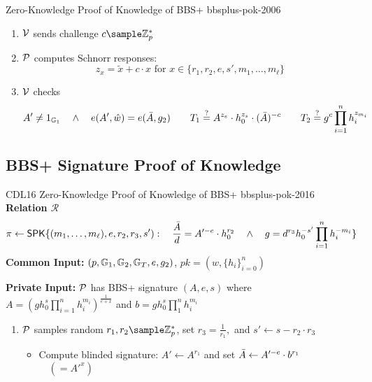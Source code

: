 {\begin{protocol}{\cite{hutchison_constant-size_2006} Zero-Knowledge Proof of Knowledge of BBS+ }{bbsplus-pok-2006}
\begin{enumerate}
\begin{itemize}
        \end{itemize}

    \item $\mathcal{V}$ sends challenge $c \sample \Z_p^*$\

    \item $\mathcal{P}$ computes Schnorr responses:
         \[
         z_x = \tilde{x} + c \cdot x \text{ for } x \in \{r_1, r_2, e, s', m_1, \ldots, m_{\ell}\}
         \]
 
    \item $\mathcal{V}$ checks
        \[
            A' \neq 1_{\mathbb{G}_1} \quad \wedge \quad e(A',\hat{w}) = e(\Bar{A},g_2) \qquad T_1 \stackrel{?}{=} A^{z_e} \cdot h_0^{z_s} \cdot (\Bar{A})^{-c} \qquad T_2 \stackrel{?}{=} g^c\prod_{i=1}^n h_i^{z_{m_i}}
        \]
    \end{enumerate}
\end{protocol}







% 
% 



\newpage
\subsection{\cite{camenisch_anonymous_2016} BBS+ Signature Proof of Knowledge}
\begin{protocol}{CDL16 Zero-Knowledge Proof of Knowledge of BBS+  \cite{camenisch_anonymous_2016}}{bbsplus-pok-2016}
    \textbf{Relation $\mathcal{R}$}
        \[
        \pi \gets \mathsf{SPK}\{(m_1,\ldots,m_{\ell}), e, r_2, r_3, s'): \quad \frac{\Bar{A}}{d} = A'^{-e} \cdot h_0^{r_2} \quad \wedge \quad g = d^{r_3}h_0^{-s'}\prod_{i=1}^n h_i^{-m_i}\}
        \]
    \textbf{Common Input:} $(p, \mathbb{G}_1, \mathbb{G}_2, \mathbb{G}_T, e, g_2)$, $pk = (\hat{w}, \{h_i\}_{i=0}^n)$

    \textbf{Private Input:} $\mathcal{P}$ has BBS+ signature $(A,e,s)$ where $A = (gh_0^s\prod_{i=1}^n h_i^{m_i})^{\frac{1}{e+x}}$ and $b = gh_0^s \prod_1^nh_i^{m_i}$

    \vspace{1em}
    \begin{enumerate}
        \item $\mathcal{P}$ samples random $r_1, r_2 \sample \Z_p^*$, set $r_3 = \frac{1}{r_1},$ and $s' \gets s - r_2 \cdot r_3$
         \begin{itemize}
        \item Compute blinded signature: $A' \gets A^{r_1}$ and set $\Bar{A} \gets A'^{-e} \cdot b^{r_1}$ $\quad (=A'^{x})$ 
        

\end{itemize}
\end{enumerate}
\end{protocol}}
